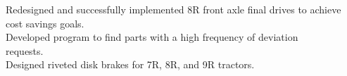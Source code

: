 \runsubsection{\textcolor{JDgreen}{John Deere}}

\runsubsection{\textcolor{JDgreen}{Drive Train Design Group}}
\begin{minipage}{1\textwidth\vspace{2pt}}
\textcolor{JDgreen}{\mybar}\faAngleRight Redesigned and successfully implemented 8R front axle final drives to achieve\\
\textcolor{JDgreen}{\mybar}\textcolor{invisible}{\faAngleRight}cost savings goals.\\
\textcolor{JDgreen}{\mybar}\faAngleRight Developed program to find parts with a high frequency of deviation \\
\textcolor{JDgreen}{\mybar}\textcolor{invisible}{\faAngleRight}requests. \\
\textcolor{JDgreen}{\mybar}\faAngleRight Designed riveted disk brakes for 7R, 8R, and 9R tractors.
\end{minipage}

\sectionsep